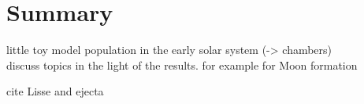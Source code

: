 \section{Summary}
little toy model population in the early solar system (-> chambers) \\
discuss topics in the light of the results. for example for Moon formation

cite Lisse and ejecta\\





\cite{Asphaug:2006p3729}

\cite{Asphaug:2010p3539}


\cite{2009ApJ...700L.118M}

\cite{2010ApJ...712L..73M}

